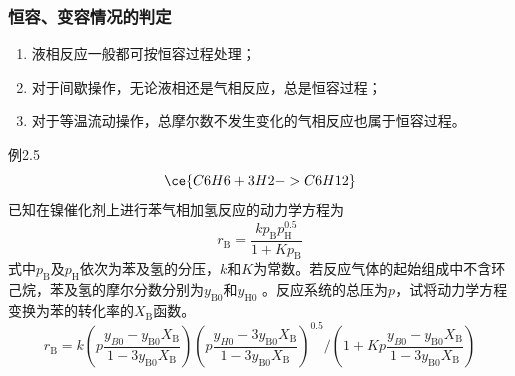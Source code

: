 \begin{frame}
    \frametitle{恒容、变容情况的判定}
    \begin{enumerate}
      \item 液相反应一般都可按恒容过程处理；
      \item 对于间歇操作，无论液相还是气相反应，总是恒容过程；
      \item 对于等温流动操作，总摩尔数不发生变化的气相反应也属于恒容过程。
    \end{enumerate}
\end{frame}




\begin{frame}[t]{}
    \begin{block}{例2.5}
    \[
        \ce{C6H6 + 3H2 -> C6H12}
    \]
    已知在镍催化剂上进行苯气相加氢反应的动力学方程为
    \[
        r_\mathrm{B}=\frac{kp_\mathrm{B}p_\mathrm{H}^{0.5}}{1+Kp_\mathrm{B}}
    \]
    式中$p_\mathrm{B}$及$p_\mathrm{H}$依次为苯及氢的分压，$k$和$K$为常数。若反应气体的起始组成中不含环己烷，苯及氢的摩尔分数分别为$y_\mathrm{B0}$和$y_\mathrm{H0}$  。反应系统的总压为$p$，试将动力学方程变换为苯的转化率的$X_\mathrm{B}$函数。
    \tcblower
    \pause
    \[
        r_\mathrm{B} = k\left(p\frac{y_{B0}-y_\mathrm{B0}X_\mathrm{B}}{1-3y_\mathrm{B0}X_\mathrm{B}}\right)\left(p\frac{y_{H0}-3y_\mathrm{B0}X_\mathrm{B}}{1-3y_\mathrm{B0}X_\mathrm{B}}\right)^{0.5}\bigg/\left(1+Kp\frac{y_{B0}-y_\mathrm{B0}X_\mathrm{B}}{1-3y_\mathrm{B0}X_\mathrm{B}}\right)
    \]
    \end{block}
\end{frame}


